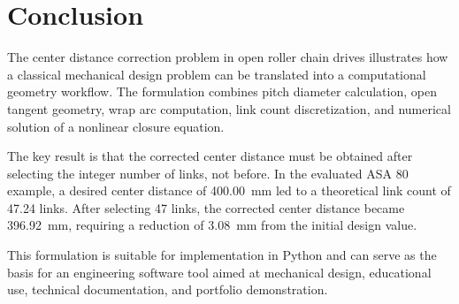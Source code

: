 \documentclass[11pt,a4paper]{article}
\begin{document}
\section{Conclusion}

The center distance correction problem in open roller chain drives illustrates how a classical mechanical design problem can be translated into a computational geometry workflow. The formulation combines pitch diameter calculation, open tangent geometry, wrap arc computation, link count discretization, and numerical solution of a nonlinear closure equation.

The key result is that the corrected center distance must be obtained after selecting the integer number of links, not before. In the evaluated ASA 80 example, a desired center distance of \SI{400.00}{mm} led to a theoretical link count of 47.24 links. After selecting 47 links, the corrected center distance became \SI{396.92}{mm}, requiring a reduction of \SI{3.08}{mm} from the initial design value.

This formulation is suitable for implementation in Python and can serve as the basis for an engineering software tool aimed at mechanical design, educational use, technical documentation, and portfolio demonstration.
\end{document}
